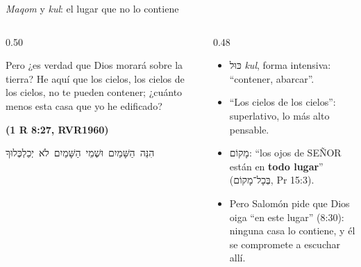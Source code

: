 \documentclass[hyperref={bookmarks=false},aspectratio=169]{beamer}
\newcommand{\heb}[1]{\mbox{\foreignlanguage{hebrew}{#1}}}
\newcommand{\SENOR}{S{\fontsize{0.78em}{1em}\selectfont EÑOR}}
\newcommand{\fuente}[1]{\par\hfill{\upshape\bfseries\footnotesize\textcolor{azul}{#1}}}
\newcommand{\destacar}[1]{\textbf{\textcolor{azul}{#1}}}
\begin{document}
\begin{frame}{\emph{Maqom} y \emph{kul}: el lugar que no lo contiene}
\begin{columns}[c,onlytextwidth]
\begin{column}{0.50\textwidth}
\begin{cita}Pero ¿es verdad que Dios morará sobre la tierra? He aquí que los cielos, los cielos de los cielos, no te pueden contener; ¿cuánto menos esta casa que yo he edificado?\fuente{(1 R 8:27, RVR1960)}\end{cita}
\begin{center}\scriptsize\heb{הִנֵּה הַשָּׁמַיִם וּשְׁמֵי הַשָּׁמַיִם לֹא יְכַלְכְּלוּךָ}\end{center}
\end{column}
\begin{column}{0.48\textwidth}\small
\begin{itemize}
\item \heb{כּוּל} \emph{kul}, forma intensiva: ``contener, abarcar''.
\item ``Los cielos de los cielos'': superlativo, lo más alto pensable.
\item \heb{מָקוֹם}: ``los ojos de \SENOR{} están en \destacar{todo lugar}'' (\heb{בְּכָל־מָקוֹם}, Pr 15:3).
\item Pero Salomón pide que Dios oiga ``en este lugar'' (8:30): ninguna casa lo contiene, y él se compromete a escuchar allí.
\end{itemize}
\end{column}
\end{columns}
\end{frame}
\end{document}
